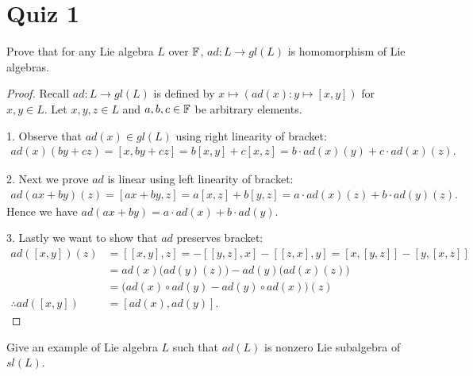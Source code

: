 


\section{Quiz 1}
\thmpara
\begin{problem}
    Prove that for any Lie algebra \(L\) over \(\mathbb{F}\), \(ad: L \to gl(L)\) is homomorphism of Lie algebras.
\end{problem}
\begin{proof}
    Recall \(ad:L \to gl(L)\) is defined by \(x \mapsto (ad(x):y \mapsto [x,y])\) for \(x,y \in L\). Let \(x,y,z\in L\) and \( a,b,c\in \mathbb{F}\) be arbitrary elements.

    1. Observe that \(ad(x) \in gl(L)\) using right linearity of bracket: 
    \begin{align*}
        ad(x)(by+cz) = [x,by+cz] = b[x,y]+c[x,z] = b\cdot ad(x)(y) + c \cdot ad(x)(z). 
    \end{align*}
    
    2. Next we prove \(ad\) is linear using left linearity of bracket:
    \begin{align*}
        ad(ax+by)(z) = [ax+by,z] = a[x,z]+b[y,z] = a\cdot ad(x)(z) + b \cdot ad(y)(z). 
    \end{align*}
    Hence we have \(ad(ax+by) = a\cdot ad(x) + b \cdot ad(y)\).
    
    3. Lastly we want to show that \(ad\) preserves bracket:
    \begin{align*}
        ad([x,y])(z)&=[[x,y],z]=-[[y,z],x]-[[z,x],y]=[x,[y,z]]-[y,[x,z]]\\
        &=ad(x)\big(ad(y)(z)\big) - ad(y)\big(ad(x)(z)\big) \\
        &=\big(ad(x)\circ ad(y) - ad(y)\circ ad(x)\big)(z)\\
        \therefore
        ad([x,y]) &= [ad(x),ad(y)].
    \end{align*}

\end{proof}
\begin{problem}
    Give an example of Lie algebra \(L\) such that \(ad(L)\) is nonzero Lie subalgebra of \(sl(L)\).
\end{problem}
